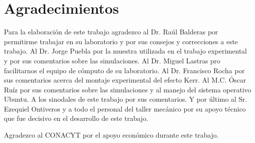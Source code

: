 \chapter{\centering Agradecimientos} %
Para la elaboraci\'on de este trabajo agradezco al Dr. Raúl Balderas por permitirme trabajar en su laboratorio y por sus consejos y correcciones  a este trabajo. Al Dr. Jorge Puebla por la muestra utilizada en el trabajo experimental y por sus comentarios sobre las simulaciones. Al Dr. Miguel Lastras pro facilitarnos el equipo de c\'omputo de su laboratorio. Al Dr. Francisco Rocha por sus comentarios acerca del montaje experimental del efecto Kerr. Al M.C. \'Oscar Ru\'iz por sus comentarios sobre las simulaciones y al manejo del sistema operativo Ubuntu.  A los sinodales de este trabajo por sus comentarios. Y por \'ultimo al Sr. Ezequiel Ontiveros y a todo el personal del taller mec\'anico por su apoyo t\'ecnico que fue decisivo en el desarrollo de este trabajo.
\newline
\par Agradezco  al CONACYT por el apoyo econ\'omico durante este trabajo. 